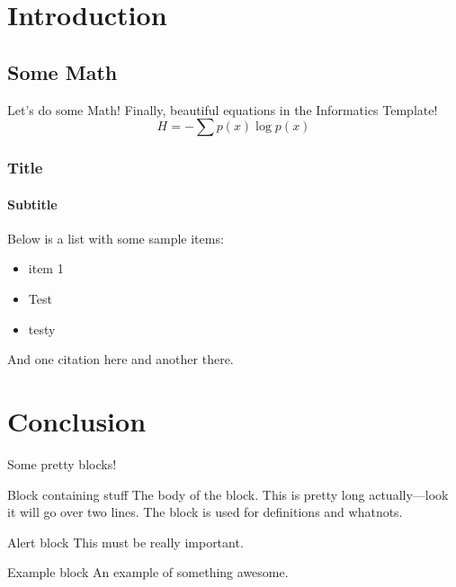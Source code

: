 \documentclass[aspectratio=169]{beamer}
\begin{document}
\section{Introduction}

\subsection{Some Math}

\begin{frame}{Let's do some Math!}
  Finally, beautiful equations in the Informatics Template!
  \begin{equation}
    H = -\sum p(x)\log p(x)
  \end{equation}
\end{frame}

\begin{frame}
  \frametitle{Title}
  \framesubtitle{Subtitle}
  Below is a list with some sample items:
  \begin{itemize}
    \item{item 1}
    \item{Test}
    \item{testy}
  \end{itemize}
  And one citation here and another there.
\end{frame}

\section{Conclusion}

\begin{frame}{Some pretty blocks!}
  \begin{block}{Block containing stuff}
    The body of the block. This is pretty long actually---look it will go over two lines. The block is used for definitions and whatnots.
  \end{block}
  \begin{alertblock}{Alert block}
    This must be really important.
  \end{alertblock}
  \begin{exampleblock}{Example block}
    An example of something awesome.
  \end{exampleblock}
\end{frame}

\begin{frame}
  \maketitle
\end{frame}
\end{document}
